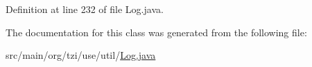 Definition at line 232 of file Log.\-java.



The documentation for this class was generated from the following file\-:\begin{DoxyCompactItemize}
\item 
src/main/org/tzi/use/util/\hyperlink{_log_8java}{Log.\-java}\end{DoxyCompactItemize}
